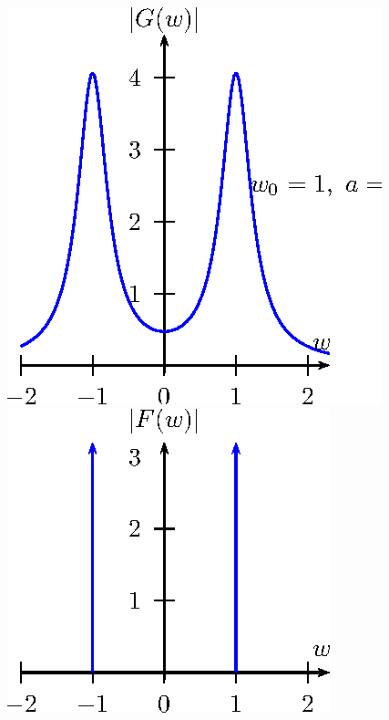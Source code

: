 \begin{ex}
\begin{figure}[!ht]
\begin{center}
\includegraphics[width=.48\textwidth]{cap_propriedades_transformada/pics/figura_6}
\includegraphics[width=.48\textwidth]{cap_propriedades_transformada/pics/figura_7}
\end{center}
\caption{\label{diag_espec_05}}
\end{figure}
\end{ex}~


